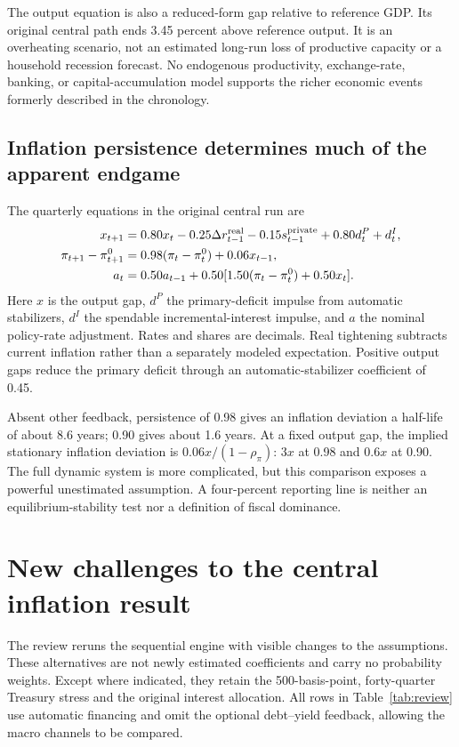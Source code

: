 \documentclass[11pt]{article}
\begin{document}
The output equation is also a reduced-form gap relative to reference GDP. Its original
central path ends 3.45 percent above reference output. It is an overheating scenario,
not an estimated long-run loss of productive capacity or a household recession forecast.
No endogenous productivity, exchange-rate, banking, or capital-accumulation model supports
the richer economic events formerly described in the chronology.

\subsection*{Inflation persistence determines much of the apparent endgame}

The quarterly equations in the original central run are
\begin{align*}
x_{t+1} &= 0.80x_t-0.25\Delta r^{\rm real}_{t-1}
 -0.15s^{\rm private}_{t-1}+0.80d^P_t+d^I_t,\\
\pi_{t+1}-\pi^0_{t+1} &= 0.98(\pi_t-\pi^0_t)+0.06x_{t-1},\\
a_t &= 0.50a_{t-1}+0.50[1.50(\pi_t-\pi^0_t)+0.50x_t].
\end{align*}
Here $x$ is the output gap, $d^P$ the primary-deficit impulse from automatic stabilizers,
$d^I$ the spendable incremental-interest impulse, and $a$ the nominal policy-rate
adjustment. Rates and shares are decimals. Real tightening subtracts current inflation
rather than a separately modeled expectation. Positive output gaps reduce the primary
deficit through an automatic-stabilizer coefficient of 0.45.

Absent other feedback, persistence of 0.98 gives an inflation deviation a half-life of
about 8.6 years; 0.90 gives about 1.6 years. At a fixed output gap, the implied stationary
inflation deviation is $0.06x/(1-\rho_\pi)$: $3x$ at 0.98 and $0.6x$ at 0.90.
The full dynamic system is more complicated, but this comparison exposes a powerful
unestimated assumption. A four-percent reporting line is neither an equilibrium-stability
test nor a definition of fiscal dominance.

\section{New challenges to the central inflation result}

The review reruns the sequential engine with visible changes to the assumptions. These
alternatives are not newly estimated coefficients and carry no probability weights. Except
where indicated, they retain the 500-basis-point, forty-quarter Treasury stress and the
original interest allocation. All rows in Table~\ref{tab:review} use automatic financing
and omit the optional debt--yield feedback, allowing the macro channels to be compared.
\end{document}
